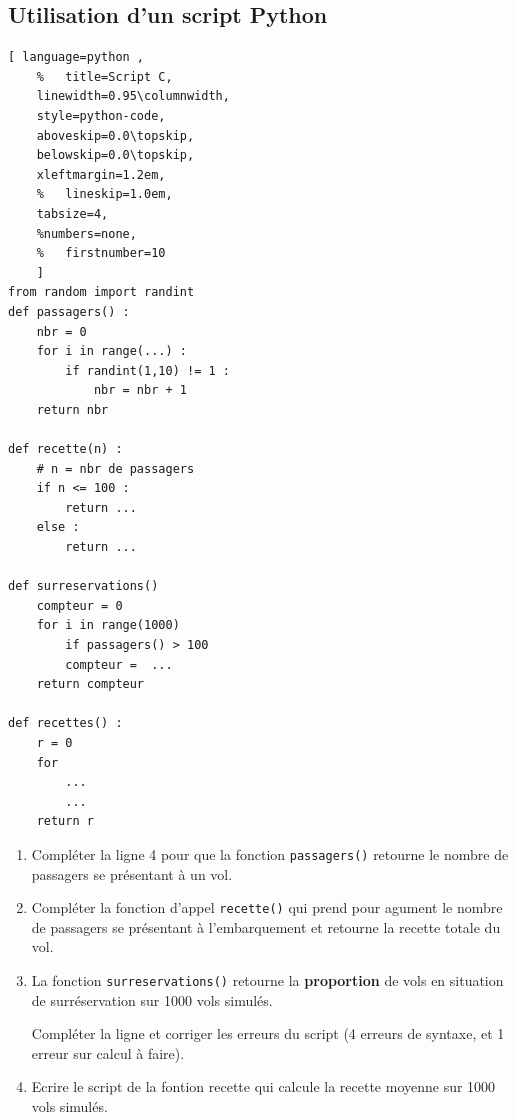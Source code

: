 \documentclass[main.tex]{subfiles}
\begin{document}
 
\newpage
\subsection{Utilisation d'un script Python}
\begin{lstlisting}[ language=python , 
	%	title=Script C,   
	linewidth=0.95\columnwidth,
	style=python-code,    
	aboveskip=0.0\topskip,
	belowskip=0.0\topskip,
	xleftmargin=1.2em,
	%	lineskip=1.0em,
	tabsize=4, 
	%numbers=none,
	%	firstnumber=10  
	] 
from random import randint
def passagers() :
	nbr = 0
	for i in range(...) :
		if randint(1,10) != 1 :	 
			nbr = nbr + 1
	return nbr

def recette(n) :
	# n = nbr de passagers
	if n <= 100 :
		return ...
	else :
		return ...
		
def surreservations()  
	compteur = 0
	for i in range(1000)  
		if passagers() > 100  
		compteur =  ...
	return compteur

def recettes() :
	r = 0
	for 
		...
		...
	return r
\end{lstlisting} 

\begin{enumerate}[label={\alph*)},leftmargin=*]
	\item Compléter la ligne 4 pour que la fonction \lstinline{passagers()} retourne le nombre de passagers se présentant à un vol.
	\item Compléter la fonction d'appel \lstinline{recette()} qui prend pour agument le nombre de passagers se présentant à l'embarquement et retourne la recette totale du vol.
	\item La fonction \lstinline{surreservations()} retourne la \textbf{proportion} de vols en situation de surréservation sur 1000 vols simulés.
	
	Compléter la ligne et corriger les erreurs du script (4 erreurs de syntaxe, et 1 erreur sur calcul à faire).
	\item Ecrire le script de la fontion recette qui calcule la recette moyenne sur 1000 vols simulés. 
\end{enumerate}


 

%	 
\cleardoublepage 
%	
\end{document}
